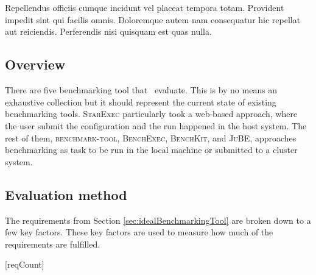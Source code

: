 \chapter{\babTiga}
\label{ch:priorWorks}

Repellendus officiis cumque incidunt vel placeat tempora totam. Provident impedit sint qui facilis omnis. Doloremque autem nam consequatur hic repellat aut reiciendis. Perferendis nisi quisquam est quas nulla.


\section{Overview}

There are five benchmarking tool that \first~evaluate.
This is by no means an exhaustive collection but it should represent the current state of existing benchmarking tools.
\textsc{StarExec} particularly took a web-based approach, where the user submit the configuration and the run happened in the host system.
The rest of them, \textsc{benchmark-tool}, \textsc{BenchExec}, \textsc{BenchKit}, and \textsc{JuBE}, approaches benchmarking as task to be run in the local machine or submitted to a cluster system.


\section{Evaluation method}

The requirements from Section \ref{sec:idealBenchmarkingTool} are broken down to a few key factors.
These key factors are used to measure how much of the requirements are fulfilled.

[reqCount]
\newcommand{\reqLabel}[1]{
	\setcounter{reqFactorCount}{0}
	\addtocounter{reqCount}{1}
	\arabic{reqCount}.
	#1
}
\newcommand{\reqFactor}[1]{
	\addtocounter{reqFactorCount}{1}
	(\alph{reqFactorCount}) #1
}


